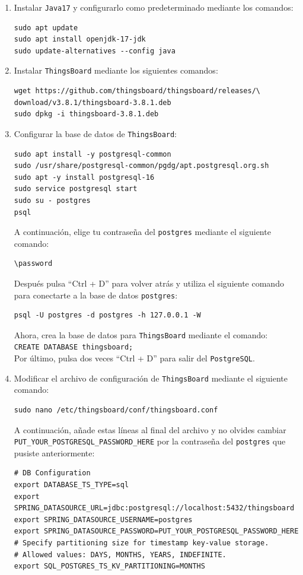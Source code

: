 \begin{enumerate}
    \item Instalar \texttt{Java17} y configurarlo como predeterminado mediante los comandos:
    \begin{verbatim}
sudo apt update
sudo apt install openjdk-17-jdk
sudo update-alternatives --config java
    \end{verbatim}

    \item Instalar \texttt{ThingsBoard} mediante los siguientes comandos:
    \begin{verbatim}
wget https://github.com/thingsboard/thingsboard/releases/\
download/v3.8.1/thingsboard-3.8.1.deb
sudo dpkg -i thingsboard-3.8.1.deb
    \end{verbatim}

    \item Configurar la base de datos de \texttt{ThingsBoard}:
    \begin{verbatim}
sudo apt install -y postgresql-common
sudo /usr/share/postgresql-common/pgdg/apt.postgresql.org.sh
sudo apt -y install postgresql-16
sudo service postgresql start
sudo su - postgres
psql
    \end{verbatim}
    A continuación, elige tu contraseña del \texttt{postgres} mediante el siguiente comando:
    \begin{verbatim}
\password
    \end{verbatim}
    Después pulsa ``Ctrl + D'' para volver atrás y utiliza el siguiente comando para conectarte a la base de datos \texttt{postgres}:
    \begin{verbatim}
psql -U postgres -d postgres -h 127.0.0.1 -W
    \end{verbatim}
    Ahora, crea la base de datos para \texttt{ThingsBoard} mediante el comando: \\
    \texttt{CREATE DATABASE thingsboard;} \\
    Por último, pulsa dos veces ``Ctrl + D'' para salir del \texttt{PostgreSQL}.

    \item Modificar el archivo de configuración de \texttt{ThingsBoard} mediante el siguiente comando:
    \begin{verbatim}
sudo nano /etc/thingsboard/conf/thingsboard.conf
    \end{verbatim}
    A continuación, añade estas líneas al final del archivo y no olvides cambiar \\
    \texttt{PUT\_YOUR\_POSTGRESQL\_PASSWORD\_HERE} por la contraseña del \texttt{postgres} que pusiste anteriormente:
    \begin{verbatim}
# DB Configuration
export DATABASE_TS_TYPE=sql
export SPRING_DATASOURCE_URL=jdbc:postgresql://localhost:5432/thingsboard
export SPRING_DATASOURCE_USERNAME=postgres
export SPRING_DATASOURCE_PASSWORD=PUT_YOUR_POSTGRESQL_PASSWORD_HERE
# Specify partitioning size for timestamp key-value storage.
# Allowed values: DAYS, MONTHS, YEARS, INDEFINITE.
export SQL_POSTGRES_TS_KV_PARTITIONING=MONTHS
    \end{verbatim}


\end{enumerate}
